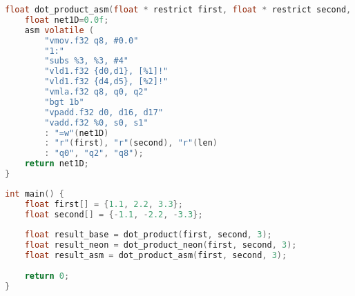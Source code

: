 \begin{lstlisting}[breaklines=true, language=C, caption=Implementacja w asemblerze. (Źródło: \cite{dot-product-asm}), label=lis:dot-product-asm]
float dot_product_asm(float * restrict first, float * restrict second, unsigned int len) {
	float net1D=0.0f;
	asm volatile (
		"vmov.f32 q8, #0.0"
		"1:"
		"subs %3, %3, #4"
		"vld1.f32 {d0,d1}, [%1]!"
		"vld1.f32 {d4,d5}, [%2]!"
		"vmla.f32 q8, q0, q2"
		"bgt 1b"
		"vpadd.f32 d0, d16, d17"
		"vadd.f32 %0, s0, s1"
		: "=w"(net1D)
		: "r"(first), "r"(second), "r"(len)
		: "q0", "q2", "q8");
	return net1D;
}
\end{lstlisting}

\begin{lstlisting}[breaklines=true, language=C, caption=Główna procedura programu., label=lis:dot-product-main]
int main() {
	float first[] = {1.1, 2.2, 3.3};
	float second[] = {-1.1, -2.2, -3.3};
	
	float result_base = dot_product(first, second, 3);
	float result_neon = dot_product_neon(first, second, 3);
	float result_asm = dot_product_asm(first, second, 3);
	
	return 0;
}
\end{lstlisting}